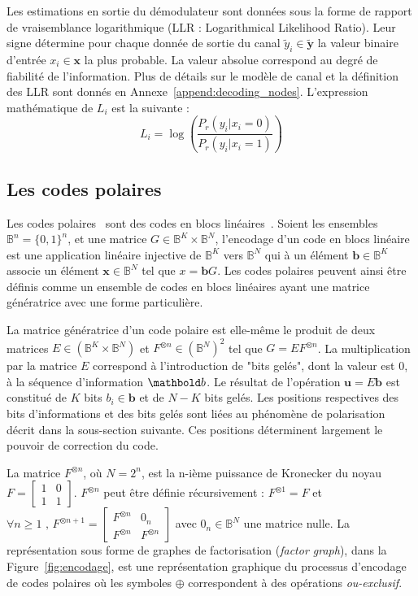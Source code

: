 Les estimations en sortie du démodulateur sont données sous la forme de rapport de vraisemblance logarithmique (LLR : Logarithmical Likelihood Ratio). Leur signe détermine pour chaque donnée de sortie du canal $\tilde{y}_i \in \mathbold{\tilde{y}}$ la valeur binaire d'entrée $x_i \in \mathbold{x}$ la plus probable. La valeur absolue correspond au degré de fiabilité de l'information. Plus de détails sur le modèle de canal et la définition des LLR sont donnés en Annexe~\ref{append:decoding_nodes}. L'expression mathématique de $L_i$ est la suivante : 
\begin{equation*}
  L_i = \log\left(\dfrac{P_r(y_i | x_i = 0)}{P_r(y_i | x_i = 1)}\right)
\end{equation*}
\subsection{Les codes polaires}
Les codes polaires~\cite{arikan_channel_2009} sont des codes en blocs linéaires~\cite{morelos-zaragoza_art_2006}. Soient les ensembles $\mathbb{B}^n = \{0,1\}^n$, et une matrice $G \in \mathbb{B}^K \times \mathbb{B}^N$, l'encodage d'un code en blocs linéaire est une application linéaire injective de $\mathbb{B}^K$ vers $\mathbb{B}^N$ qui à un élément $\mathbold{b} \in \mathbb{B}^K$ associe un élément $\mathbold{x} \in \mathbb{B}^N$ tel que $x=\mathbold{b}G$. Les codes polaires peuvent ainsi être définis comme un ensemble de codes en blocs linéaires ayant une matrice génératrice avec une forme particulière.

La matrice génératrice d'un code polaire est elle-même le produit de deux matrices $E \in (\mathbb{B}^K \times \mathbb{B}^N)$ et $F^{\otimes n}\in (\mathbb{B}^N)^2$ tel que $G=EF^{\otimes n}$. La multiplication par la matrice $E$ correspond à l'introduction de "bits gelés", dont la valeur est $0$, à la séquence d'information $\mb{b}$. Le résultat de l'opération $\mathbold{u} = E\mathbold{b}$ est constitué de $K$ bits $b_i \in \mathbold{b}$ et de $N-K$ bits gelés. Les positions respectives des bits d'informations et des bits gelés sont liées au phénomène de polarisation décrit dans la sous-section suivante. Ces positions déterminent largement le pouvoir de correction du code.

La matrice $F^{\otimes n}$, où $N=2^n$, est la n-ième puissance de Kronecker du noyau $F=\left[\begin{smallmatrix} 1 & 0 \\ 1 & 1\end{smallmatrix}\right]$. $F^{\otimes n}$ peut être définie récursivement : $F^{\otimes 1} = F$ et $\forall {n \geq 1}\text{ , }{F^{\otimes n + 1}=\left[\begin{smallmatrix} F^{\otimes n} & 0_n \\ F^{\otimes n} & F^{\otimes n}\end{smallmatrix}\right]}$ avec $0_n \in \mathbb{B}^N$ une matrice nulle. La représentation sous forme de graphes de factorisation (\textit{factor graph}), dans la Figure~\ref{fig:encodage}, est une représentation graphique du processus d'encodage de codes polaires où les symboles $\oplus$ correspondent à des opérations \textit{ou-exclusif}. 

